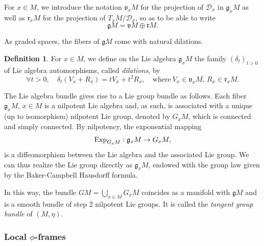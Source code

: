 \documentclass[12pt,a4paper]{amsart}
\theoremstyle{plain}
\theoremstyle{definition}
\newtheorem{definition}[theorem]{Definition}
\theoremstyle{remark}
\numberwithin{equation}{section}
\theoremstyle{definition}
\def \Exp{{\rm Exp}}
\def \cD{\mathcal{D}}
\def \fg{\mathfrak{g}}
\def \fv{\mathfrak{v}}
\def \fr{\mathfrak{r}}
\numberwithin{equation}{section}
\begin{document}
For $x\in M$, we introduce the notation $\fv_x M$ for the projection of $\cD_x$ in 
$\fg_x M$ as well as $\fr_x M$ for the projection of $T_x M/ \cD_x$, so as to be able to write
\begin{equation*}
 \fg M = \fv M \oplus \fr M.
\end{equation*}


As graded spaces, the fibers of $\fg M$ come with natural dilations.

\begin{definition}
    \label{def:dilations}
    For $x\in M$, we define on the Lie algebra $\fg_x M$ the family $(\delta_t)_{t>0}$ of Lie algebra automorphisms, called \emph{dilations}, by 
    \begin{equation*}
        \forall t>0,\quad \delta_t(V_x+R_x) = t V_x + t^2 R_x,\quad\mbox{where}\ 
        V_x \in \fv_x M,\, R_x \in \fr_x M.
    \end{equation*}
\end{definition}

The Lie algebra bundle gives rise to a Lie group bundle as follows. Each fiber $\fg_x M$, $x\in M$ is a nilpotent Lie algebra and, as such, is associated with a unique (up to isomorphism) nilpotent Lie group, denoted by $G_x M$, which is connected and simply connected. By nilpotency, the exponential mapping 
\begin{equation*}
    \Exp_{G_x M}: \fg_x M \rightarrow G_x M,
\end{equation*}
is a diffeomorphism between the Lie algebra and the associated Lie group.
We can thus realize the Lie group directly as $\fg_x M$, endowed with the group law given by the Baker-Campbell Hausdorff formula.

In this way, the bundle $GM = \bigcup_{x\in M} G_x M$ coincides as a manifold with $\fg M$ and is a smooth bundle of step 2 nilpotent Lie groups. It is called the \emph{tangent group bundle} of $(M,\eta)$.

\subsubsection{Local $\phi$-frames}
\label{subsubsect:phiframe}
\end{document}
